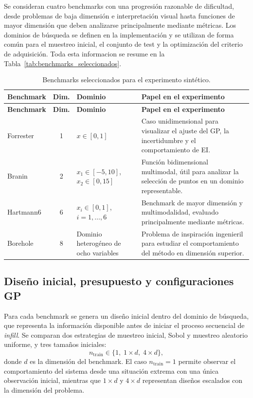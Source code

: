 Se consideran cuatro benchmarks con una progresión razonable de dificultad, desde problemas de baja dimensión e interpretación visual hasta funciones de mayor dimensión que deben analizarse principalmente mediante métricas. Los dominios de búsqueda se definen en la implementación y se utilizan de forma común para el muestreo inicial, el conjunto de test y la optimización del criterio de adquisición. Toda esta informacion se resume en la Tabla~\ref{tab:benchmarks_seleccionados}.

\protect{}\label{tab:benchmarks_seleccionados}
\begin{longtable}[]{@{}lcll@{}}
\caption{Benchmarks seleccionados para el experimento sintético.}\tabularnewline
\toprule\noalign{}
\textbf{Benchmark} & \textbf{Dim.} & \textbf{Dominio} & \textbf{Papel en el experimento} \\
\midrule\noalign{}
\endfirsthead
\toprule\noalign{}
\textbf{Benchmark} & \textbf{Dim.} & \textbf{Dominio} & \textbf{Papel en el experimento} \\
\midrule\noalign{}
\endhead
\bottomrule\noalign{}
\endlastfoot
Forrester & 1 & \(x \in [0,1]\) & Caso unidimensional para visualizar el ajuste del GP, la incertidumbre y el comportamiento de EI. \\
Branin & 2 & \(x_1 \in [-5,10]\), \(x_2 \in [0,15]\) & Función bidimensional multimodal, útil para analizar la selección de puntos en un dominio representable. \\
Hartmann6 & 6 & \(x_i \in [0,1]\), \(i=1,\dots,6\) & Benchmark de mayor dimensión y multimodalidad, evaluado principalmente mediante métricas. \\
Borehole & 8 & Dominio heterogéneo de ocho variables & Problema de inspiración ingenieril para estudiar el comportamiento del método en dimensión superior. \\
\end{longtable}

\subsection{Diseño inicial, presupuesto y configuraciones GP}\label{subsec:diseno_inicial_presupuesto}

Para cada benchmark se genera un diseño inicial dentro del dominio de búsqueda, que representa la información disponible antes de iniciar el proceso secuencial de \emph{infill}. Se comparan dos estrategias de muestreo inicial, Sobol y muestreo aleatorio uniforme, y tres tamaños iniciales: \[n_{\text{train}} \in \{1,\; 1 \times d,\; 4 \times d\},\] donde \(d\) es la dimensión del benchmark. El caso \(n_{\text{train}}=1\) permite observar el comportamiento del sistema desde una situación extrema con una única observación inicial, mientras que \(1 \times d\) y \(4 \times d\) representan diseños escalados con la dimensión del problema.

